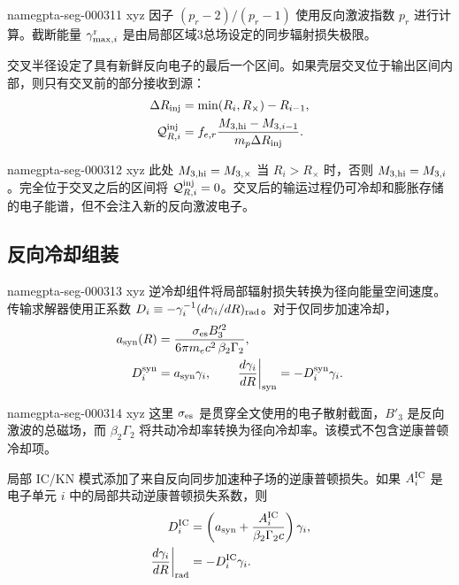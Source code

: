 \documentclass[twocolumn]{aastex702}
\makeatletter
\providecommand{\gptareaderanchor}[1]{\pdfdest name{#1} xyz}%
\providecommand{\gptareaderanchor}[1]{\special{pdf:dest (#1) [ @thispage /XYZ @xpos @ypos null ]}}%
\makeatother
\begin{document}
\gptareaderanchor{gpta-seg-000311}%
因子 \((p_r-2)/(p_r-1)\) 使用反向激波指数 \(p_r\) 进行计算。截断能量 \(\gamma_{\max,i}^{\rm r}\) 是由局部区域3总场设定的同步辐射损失极限。

交叉半径设定了具有新鲜反向电子的最后一个区间。如果壳层交叉位于输出区间内部，则只有交叉前的部分接收到源：
\begin{equation}
\begin{aligned}
\Delta R_{\rm inj}&=\min(R_i,R_\times)-R_{i-1},\\
\mathcal Q^{\rm inj}_{R,i}
&=f_{e,r}\frac{M_{3,{\rm hi}}-M_{3,i-1}}
{m_p\Delta R_{\rm inj}}.
\end{aligned}
\end{equation}

\gptareaderanchor{gpta-seg-000312}%
此处 \(M_{3,{\rm hi}}=M_{3,\times}\) 当 \(R_i>R_\times\) 时，否则 \(M_{3,{\rm hi}}=M_{3,i}\)。完全位于交叉之后的区间将 \(\mathcal Q^{\rm inj}_{R,i}=0\)。交叉后的输运过程仍可冷却和膨胀存储的电子能谱，但不会注入新的反向激波电子。

\subsection{反向冷却组装}


\gptareaderanchor{gpta-seg-000313}%
逆冷却组件将局部辐射损失转换为径向能量空间速度。传输求解器使用正系数 \(D_i\equiv-\gamma_i^{-1}(d\gamma_i/dR)_{\rm rad}\)。对于仅同步加速冷却，
\begin{equation}
\begin{aligned}
a_{\rm syn}(R)&=
\frac{\sigma_{\rm es} B_3^{\prime 2}}{6\pi m_ec^2\,\beta_2\Gamma_2},\\
D_i^{\rm syn}&=a_{\rm syn}\gamma_i,\qquad
\left.\frac{d\gamma_i}{dR}\right|_{\rm syn}
=-D_i^{\rm syn}\gamma_i .
\end{aligned}
\end{equation}

\gptareaderanchor{gpta-seg-000314}%
这里 \(\sigma_{\rm es}\) 是贯穿全文使用的电子散射截面，\(B'_3\) 是反向激波的总磁场，而 \(\beta_2\Gamma_2\) 将共动冷却率转换为径向冷却率。该模式不包含逆康普顿冷却项。

局部 IC/KN 模式添加了来自反向同步加速种子场的逆康普顿损失。如果 \(A_i^{\rm IC}\) 是电子单元 \(i\) 中的局部共动逆康普顿损失系数，则
\begin{equation}
\begin{aligned}
D_i^{\rm IC}&=
\left(a_{\rm syn}+\frac{A_i^{\rm IC}}{\beta_2\Gamma_2c}\right)\gamma_i,\\
\left.\frac{d\gamma_i}{dR}\right|_{\rm rad}
&=-D_i^{\rm IC}\gamma_i .
\end{aligned}
\end{equation}
\end{document}
